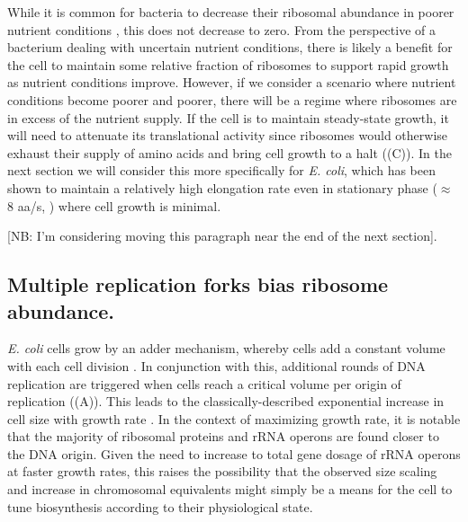 While it is common for bacteria to decrease their ribosomal abundance in poorer
nutrient conditions \cite{scott2010, liebermeister2014}, this does not decrease
to zero. From the perspective of a bacterium dealing with uncertain nutrient
conditions, there is likely a benefit for the cell to maintain some relative
fraction of ribosomes to support rapid growth as nutrient conditions improve.
However, if we consider a scenario where nutrient conditions become poorer and
poorer, there will be a regime where ribosomes are in excess of the nutrient
supply. If the cell is to maintain steady-state growth, it will need to
attenuate its translational activity since ribosomes would otherwise exhaust
their supply of amino acids and bring cell growth to a halt
((C)). In the next section we will consider this more
specifically for \textit{E. coli}, which has been shown to maintain a relatively
high elongation rate even in stationary phase ($\approx$ 8 aa/s, \cite{dai2016})
where cell growth is minimal.

[NB: I'm considering moving this paragraph near the end of the next section].


\subsection{Multiple replication forks bias ribosome abundance.}

\textit{E. coli} cells grow by an adder mechanism, whereby cells add a constant
volume with each cell division \citep{taheriaraghi2015}. In conjunction with
this, additional rounds of DNA replication are triggered when cells reach a
critical volume per origin of replication ((A)). This
leads to the classically-described exponential increase in cell size with growth
rate \cite{schaechter1958, si2017, si2019}. In the context of maximizing growth
rate, it is notable that the majority of ribosomal proteins and rRNA operons are
found closer to the DNA origin. Given the need to increase to total gene dosage
of rRNA operons at faster growth rates, this raises the possibility that the
observed size scaling and increase in chromosomal equivalents might simply be
a means for the cell to tune biosynthesis according to their
physiological state.

